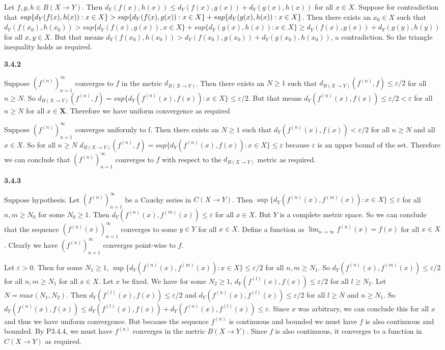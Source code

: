 \documentclass[12pt]{article}
\begin{document}
Let $f,g,h\in B(X\to Y)$. Then $d_Y(f(x),h(x))\leq d_Y(f(x),g(x)) + d_Y(g(x),h(x))$ for all $x\in X$. Suppose for contradiction that $\\sup\{d_Y(f(x),h(x)): x\in X\} > sup\{d_Y(f(x),g(x)): x\in X\}+\\sup\{d_Y(g(x),h(x)): x\in X\}$. Then there exists an $x_0\in X$ such that $d_Y(f(x_0),h(x_0))>sup\{d_Y(f(x),g(x)), x\in X\}+sup\{d_Y(g(x),h(x)): x\in X\} \geq d_Y(f(x),g(x))+d_Y(g(y),h(y))$ for all $x,y\in X$. But that means $d_Y(f(x_0),h(x_0))>d_Y(f(x_0),g(x_0))+d_Y(g(x_0),h(x_0))$, a contradiction. So the triangle inequality holds as required.

\textbf{3.4.2}

Suppose $(f^{(n)})_{n=1}^\infty$ converges to $f$ in the metric $d_{B(X\to Y)}$. Then there exists an $N\geq 1$ such that $d_{B(X\to Y)}(f^{(n)},f) \leq \varepsilon/2$ for all $n\geq N$. So $d_{B(X\to Y)}(f^{(n)},f) = sup\{d_Y(f^{(n)}(x), f(x)): x\in X\}\leq \varepsilon/2$. But that means $d_Y(f^{(n)}(x), f(x)) \leq \varepsilon/2 < \varepsilon$ for all $n\geq N$ for all $x\in \textbf{X}$. Therefore we have uniform convergence as required

Suppose $(f^{(n)})^\infty_{n=1}$ converges uniformly to f. Then there exists an $N\geq 1$ such that $d_Y(f^{(n)}(x), f(x)) < \varepsilon/2$ for all $n\geq N$ and all $x\in X$. So for all $n\geq N$ $d_{B(X\to Y)}(f^{(n)},f)=sup\{d_Y(f^{(n)}(x), f(x)): x\in X\} \leq \varepsilon$ because $\varepsilon$ is an upper bound of the set. Therefore we can conclude that $(f^{(n)})^\infty_{n=1}$ converges to $f$ with respect to the $d_{B(X\to Y)}$ metric as required.

\textbf{3.4.3}

Suppose hypothesis. Let $(f^{(n)})^\infty_{n=1}$ be a Cauchy series in $C(X\to Y)$. Then $\sup\{d_Y(f^{(n)}(x), f^{(m)}(x)):x\in X\} \leq \varepsilon$ for all $n,m\geq N_0$ for some $N_0\geq 1$. Then $d_Y(f^{(n)}(x), f^{(m)}(x)) \leq \varepsilon$ for all $x\in X$. But $Y$ is a complete metric space. So we can conclude that the sequence $(f^{(n)}(x))^\infty_{n=1}$ converges to some $y\in Y$ for all $x\in X$. Define a function as $ \lim_{n\to \infty}f^{(n)}(x) = f(x)$ for all $x\in X$. Clearly we have $(f^{(n)})^{\infty}_{n=1}$ converges point-wise to $f$. 

Let $\varepsilon>0$. Then for some $N_1\geq 1$, $ \sup\{d_Y(f^{(n)}(x), f^{(m)}(x)):x\in X\} \leq \varepsilon/2$ for all $n,m\geq N_1$. So $d_Y(f^{(n)}(x), f^{(m)}(x)) \leq \varepsilon/2$ for all $n,m\geq N_1$ for all $x\in X$. Let $x$ be fixed. We have for some $N_2\geq 1$, $d_Y(f^{(l)}(x),f(x))\leq \varepsilon/2$ for all $l\geq N_2$. Let $N=max(N_1,N_2)$. Then $ d_Y(f^{(l)}(x),f(x)) \leq \varepsilon/2$ and $d_Y(f^{(n)}(x),f^{(l)}(x))\leq \varepsilon/2 $ for all $l\geq N$ and $n\geq N_1 $. So $d_Y(f^{(n)}(x), f(x))\leq d_Y(f^{(l)}(x),f(x)) + d_Y(f^{(n)}(x),f^{(l)}(x)) \leq \varepsilon$. Since $x$ was arbitrary, we can conclude this for all $x$ and thus we have uniform convergence. But because the sequence $f^{(n)}$ is continuous and bounded we must have $f$ is also continuous and bounded. By P3.4.4, we must have $ f^{(n)}$ converges in the metric $B(X\to Y)$. Since $ f$ is also continuous, it converges to a function in $C(X\to Y)$ as required.
\end{document}
